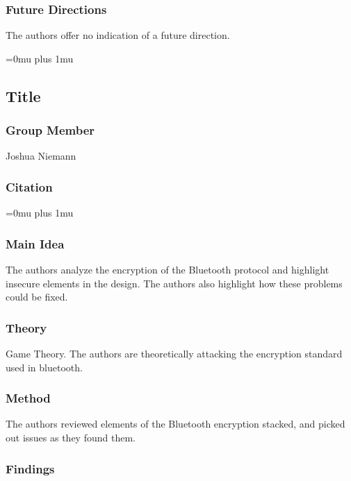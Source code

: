 \subsubsection{Future Directions}

\noindent
The authors offer no indication of a future direction. 

\Urlmuskip=0mu plus 1mu\relax

\noindent
\subsection{Title}

\subsubsection{Group Member}

\noindent
Joshua Niemann

\noindent
\subsubsection{Citation}

\Urlmuskip=0mu plus 1mu\relax

\subsubsection{Main Idea}

\noindent
The authors analyze the encryption of the Bluetooth protocol and highlight insecure elements in the design.  The authors also highlight how these problems could be fixed.

\subsubsection{Theory}

\noindent
Game Theory.  The authors are theoretically attacking the encryption standard used in bluetooth.

\subsubsection{Method}

\noindent
The authors reviewed elements of the Bluetooth encryption stacked, and picked out issues as they found them.  

\subsubsection{Findings}


